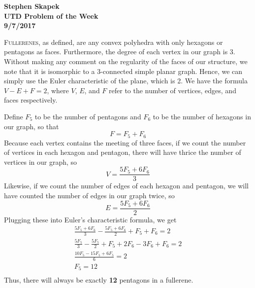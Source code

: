 \documentclass{article}
\begin{document}
\begin{flushright}
\textbf{Stephen Skapek\\UTD Problem of the Week\\9/7/2017}
\end{flushright}

\lettrine[realheight]{F}{ullerenes}, as defined, are any convex polyhedra with only hexagons or pentagons as faces. Furthermore, the degree of each vertex in our graph is 3. Without making any comment on the regularity of the faces of our structure, we note that it is isomorphic to a 3-connected simple planar graph. Hence, we can simply use the Euler characteristic of the plane, which is 2. We have the formula $V - E + F = 2$, where $V$, $E$, and $F$ refer to the number of vertices, edges, and faces respectively.  \par
Define $F_5$ to be the number of pentagons and $F_6$ to be the number of hexagons in our graph, so that $$F = F_5 +F _6$$ Because each vertex contains the meeting of three faces, if we count the number of vertices in each hexagon and pentagon, there will have thrice the number of vertices in our graph, so $$V = \frac{5F_5+6F_6}{3}$$ Likewise, if we count the number of edges of each hexagon and pentagon, we will have counted the number of edges in our graph twice, so $$E = \frac{5F_5+6F_6}{2}$$
Plugging these into Euler's characteristic formula, we get 
\begin{gather*}
\frac{5F_5+6F_6}{3} - \frac{5F_5+6F_6}{2} + F_5 +F _6 = 2\\
\frac{5F_5}{3} - \frac{5F_5}{2} + F_5 + 2F_6 - 3F_6 + F_6 = 2\\
\frac{10F_5 - 15F_5 + 6F_5}{6} = 2\\
F_5 = 12\\
\end{gather*}
Thus, there will always be exactly \textbf{12} pentagons in a fullerene.
\end{document}
